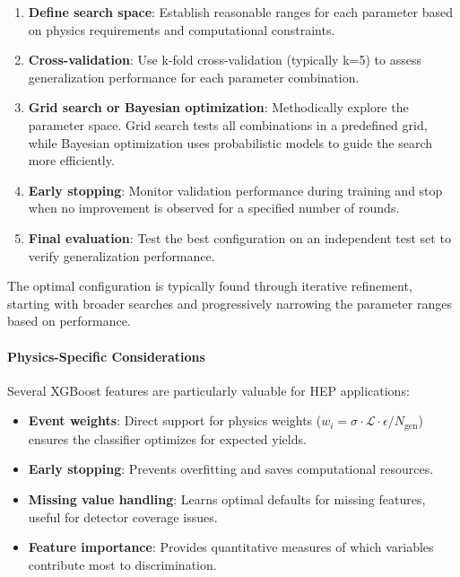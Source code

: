 \begin{enumerate}
    \item \textbf{Define search space}: Establish reasonable ranges for each parameter based on physics requirements and computational constraints.
    
    \item \textbf{Cross-validation}: Use k-fold cross-validation (typically k=5) to assess generalization performance for each parameter combination.
    
    \item \textbf{Grid search or Bayesian optimization}: Methodically explore the parameter space. Grid search tests all combinations in a predefined grid, while Bayesian optimization uses probabilistic models to guide the search more efficiently.
    
    \item \textbf{Early stopping}: Monitor validation performance during training and stop when no improvement is observed for a specified number of rounds.
    
    \item \textbf{Final evaluation}: Test the best configuration on an independent test set to verify generalization performance.
\end{enumerate}

The optimal configuration is typically found through iterative refinement, starting with broader searches and progressively narrowing the parameter ranges based on performance.

\paragraph{Physics-Specific Considerations}

Several XGBoost features are particularly valuable for HEP applications:

\begin{itemize}
    \item \textbf{Event weights}: Direct support for physics weights ($w_i = \sigma \cdot \mathcal{L} \cdot \epsilon / N_{\text{gen}}$) ensures the classifier optimizes for expected yields.
    
    \item \textbf{Early stopping}: Prevents overfitting and saves computational resources.
    
    \item \textbf{Missing value handling}: Learns optimal defaults for missing features, useful for detector coverage issues.
    
    \item \textbf{Feature importance}: Provides quantitative measures of which variables contribute most to discrimination.
\end{itemize}

